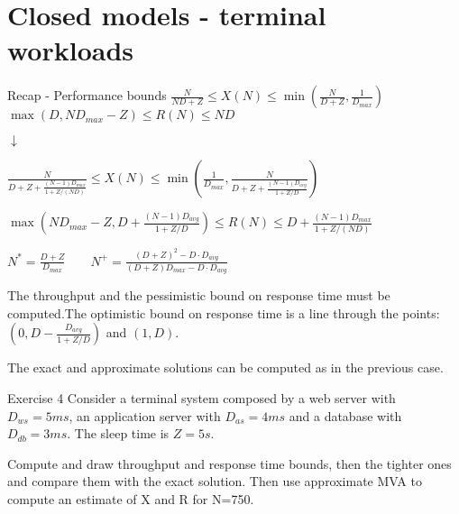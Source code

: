 \documentclass{beamer}
\begin{document}
\section{Closed models - terminal workloads}

\begin{frame}{Recap - Performance bounds}
\centering
$\frac{N}{ND+Z} \leq X(N) \leq \min{(\frac{N}{D+Z}, \frac{1}{D_{max}})}$\\
$\max{(D, ND_{max} - Z)} \leq R(N) \leq ND$

$\downarrow$

$\frac{N}{D + Z + \frac{(N-1)D_{max}}{1+Z/(ND)}} \leq X(N) \leq \min(\frac{1}{D_{max}}, \frac{N}{D + Z + \frac{(N-1)D_{avg}}{1+Z/D}})$

$\max(N D_{max} - Z, D + \frac{(N-1)D_{avg}}{1+Z/D}) \leq R(N) \leq D + \frac{(N-1)D_{max}}{1+Z/(ND)}$

$N^* = \frac{D+Z}{D_{max}} \qquad N^+ = \frac{(D+Z)^2 -D \cdot D_{avg}}{(D+Z)D_{max} - D\cdot D_{avg}}$

The throughput and the pessimistic bound on response time must be computed.The optimistic bound on response time is a line through the points: $(0, D-\frac{D_{avg}}{1+Z/D})$ and $(1,D)$.

The exact and approximate solutions can be computed as in the previous case.
\end{frame}

\begin{frame}{Exercise 4}
Consider a terminal system composed by a web server with $D_{ws} = 5ms$, an application server with $D_{as} = 4ms$ and a database with $D_{db} = 3ms$. The sleep time is $Z=5s$.

Compute and draw throughput and response time bounds, then the tighter ones and compare them with the exact solution. Then use approximate MVA to compute an estimate of X and R for N=750.
\end{frame}
\end{document}
